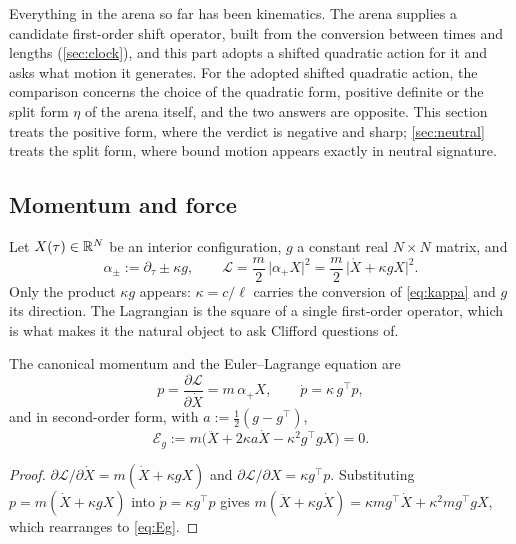 Everything in the arena so far has been kinematics. The arena supplies a candidate first-order shift operator, built from the conversion
between times and lengths (\cref{sec:clock}), and this part adopts a shifted quadratic action for it and asks what motion it generates. For the
adopted shifted quadratic action, the comparison concerns the choice of the quadratic form, positive definite or the split form $\eta$ of the
arena itself, and the two answers are opposite. This section treats the positive form, where the verdict is negative and
sharp; \cref{sec:neutral} treats the split form, where bound motion appears exactly in neutral signature.

\subsection{Momentum and force}

Let $X(\tau)\in\mathbb{R}^N$ be an interior configuration, $g$ a constant real $N\times N$ matrix, and
\begin{equation}
\label{eq:alpha}
\alpha_\pm:=\partial_\tau\pm\kappa g,\qquad \mathcal L=\frac m2\,\bigl|\alpha_+X\bigr|^2=\frac m2\,\bigl|\dot X+\kappa gX\bigr|^2 .
\end{equation}
Only the product $\kappa g$ appears: $\kappa=c/\ell$ carries the conversion of \eqref{eq:kappa} and $g$ its direction. The Lagrangian is the
square of a single first-order operator, which is what makes it the natural object to ask Clifford questions of.

\begin{proposition}
\label{prop:force}
The canonical momentum and the Euler--Lagrange equation are
\begin{equation}
\label{eq:pdot}
p=\frac{\partial\mathcal L}{\partial\dot X}=m\,\alpha_+X,\qquad \dot p=\kappa\,g^{\!\top}p ,
\end{equation}
and in second-order form, with $a:=\tfrac12(g-g^{\!\top})$,
\begin{equation}
\label{eq:Eg}
\mathcal E_g:=m\bigl(\ddot X+2\kappa a\dot X-\kappa^2g^{\!\top}gX\bigr)=0 .
\end{equation}
\end{proposition}

\begin{proof}
$\partial\mathcal L/\partial\dot X=m(\dot X+\kappa gX)$ and $\partial\mathcal L/\partial X=\kappa g^{\!\top}p$. Substituting $p=m(\dot X+\kappa gX)$ into
$\dot p=\kappa g^{\!\top}p$ gives $m(\ddot X+\kappa g\dot X)=\kappa mg^{\!\top}\dot X+\kappa^2mg^{\!\top}gX$, which rearranges to \eqref{eq:Eg}.
\end{proof}

